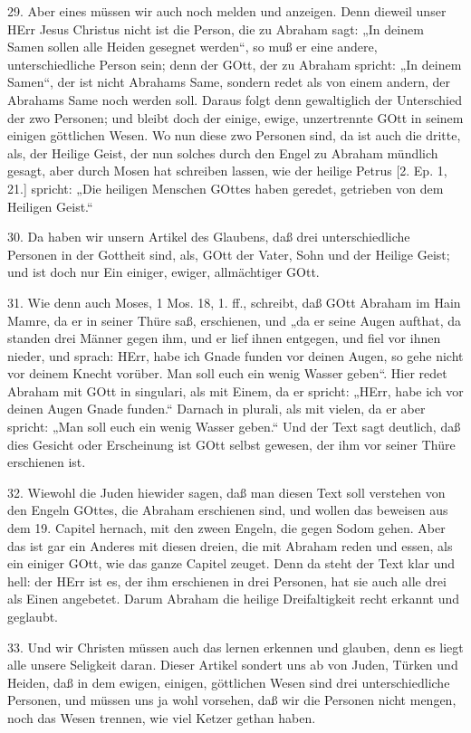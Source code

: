 29. Aber eines müssen wir auch noch melden und anzeigen. Denn dieweil unser HErr Jesus Christus nicht ist die Person, die zu Abraham sagt: „In deinem Samen sollen alle Heiden gesegnet werden“, so muß er eine andere, unterschiedliche Person sein; denn der GOtt, der zu Abraham spricht: „In deinem Samen“,
der ist nicht Abrahams Same, sondern redet als von einem andern, der Abrahams Same noch werden soll. Daraus folgt denn gewaltiglich der Unterschied der zwo Personen; und bleibt doch der einige, ewige, unzertrennte GOtt in seinem einigen göttlichen Wesen. Wo nun diese zwo Personen sind, da ist auch die dritte, als, der Heilige Geist, der nun solches durch den Engel zu Abraham mündlich gesagt, aber durch Mosen hat schreiben lassen, wie der heilige Petrus [2. Ep. 1, 21.] spricht: „Die heiligen Menschen GOttes haben geredet, getrieben von dem Heiligen Geist.“

30. Da haben wir unsern Artikel des Glaubens, daß drei unterschiedliche Personen in der Gottheit sind, als, GOtt der Vater, Sohn und der Heilige Geist; und ist doch nur Ein einiger, ewiger, allmächtiger GOtt.

31. Wie denn auch Moses, 1 Mos. 18, 1. ff., schreibt, daß GOtt Abraham im Hain Mamre, da er in seiner Thüre saß, erschienen, und „da er seine Augen aufthat, da standen drei Männer gegen ihm, und er lief ihnen entgegen, und fiel vor ihnen nieder, und sprach: HErr, habe ich Gnade funden vor deinen Augen, so gehe nicht vor deinem Knecht vorüber. Man soll euch ein wenig Wasser geben“. Hier redet Abraham mit GOtt in singulari, als mit Einem, da er spricht: „HErr, habe ich vor deinen Augen Gnade funden.“ Darnach in plurali, als mit vielen, da er aber spricht: „Man soll euch ein wenig Wasser geben.“ Und der Text sagt deutlich, daß dies Gesicht oder Erscheinung ist GOtt selbst gewesen, der ihm vor seiner Thüre erschienen ist.

32. Wiewohl die Juden hiewider sagen, daß man diesen Text soll verstehen von den Engeln GOttes, die Abraham erschienen sind, und wollen das beweisen aus dem 19. Capitel hernach, mit den zween Engeln, die gegen Sodom gehen. Aber das ist gar ein Anderes mit diesen dreien, die mit Abraham reden und essen, als ein einiger GOtt, wie das ganze Capitel zeuget. Denn da steht der Text klar und hell: der HErr ist es, der ihm erschienen in drei Personen, hat sie auch alle drei als Einen angebetet. Darum Abraham die heilige Dreifaltigkeit recht erkannt und geglaubt.

33. Und wir Christen müssen auch das lernen erkennen und glauben, denn es liegt alle unsere Seligkeit daran. Dieser Artikel sondert uns ab von Juden, Türken und Heiden, daß in dem ewigen, einigen, göttlichen Wesen sind drei unterschiedliche Personen, und müssen uns ja wohl vorsehen, daß wir die Personen nicht mengen, noch das Wesen trennen, wie viel Ketzer gethan haben.

